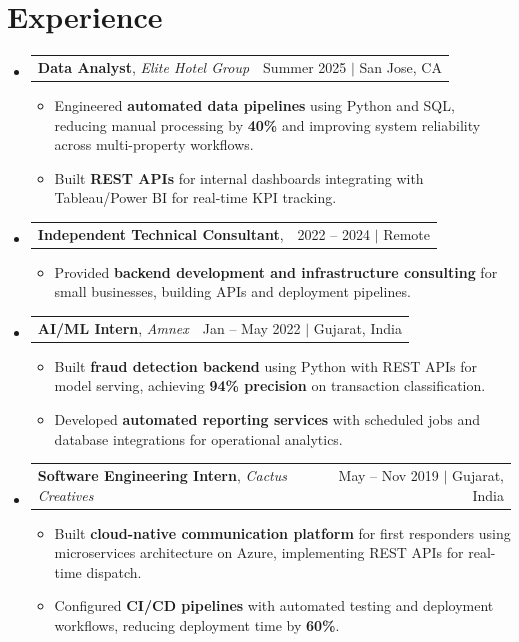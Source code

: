 \documentclass[letterpaper,10pt]{article}
\makeatletter
\newcommand{\resumeItem}[1]{\item\small{#1 \vspace{-3pt}}}
\newcommand{\resumeExpHeading}[4]{
  \vspace{-3pt}\item
    \begin{tabular*}{0.97\textwidth}[t]{l@{\extracolsep{\fill}}r}
      \textbf{#1}, \textit{#3} & #2 \\
    \end{tabular*}\vspace{-8pt}
}
\newcommand{\resumeSubHeadingListStart}{\begin{itemize}[leftmargin=0.12in, label={}]}
\newcommand{\resumeSubHeadingListEnd}{\end{itemize}}
\newcommand{\resumeItemListStart}{\begin{itemize}[leftmargin=0.15in]}
\newcommand{\resumeItemListEnd}{\end{itemize}\vspace{-6pt}}
\makeatother
\begin{document}
\section{Experience}
  \resumeSubHeadingListStart

    \resumeExpHeading
      {Data Analyst}{Summer 2025 $|$ San Jose, CA}
      {Elite Hotel Group}{}
      \resumeItemListStart
        \resumeItem{Engineered \textbf{automated data pipelines} using Python and SQL, reducing manual processing by \textbf{40\%} and improving system reliability across multi-property workflows.}
        \resumeItem{Built \textbf{REST APIs} for internal dashboards integrating with Tableau/Power BI for real-time KPI tracking.}
      \resumeItemListEnd

    \resumeExpHeading
      {Independent Technical Consultant}{2022 -- 2024 $|$ Remote}
      {}{}
      \resumeItemListStart
        \resumeItem{Provided \textbf{backend development and infrastructure consulting} for small businesses, building APIs and deployment pipelines.}
      \resumeItemListEnd

    \resumeExpHeading
      {AI/ML Intern}{Jan -- May 2022 $|$ Gujarat, India}
      {Amnex}{}
      \resumeItemListStart
        \resumeItem{Built \textbf{fraud detection backend} using Python with REST APIs for model serving, achieving \textbf{94\% precision} on transaction classification.}
        \resumeItem{Developed \textbf{automated reporting services} with scheduled jobs and database integrations for operational analytics.}
      \resumeItemListEnd

    \resumeExpHeading
      {Software Engineering Intern}{May -- Nov 2019 $|$ Gujarat, India}
      {Cactus Creatives}{}
      \resumeItemListStart
        \resumeItem{Built \textbf{cloud-native communication platform} for first responders using microservices architecture on Azure, implementing REST APIs for real-time dispatch.}
        \resumeItem{Configured \textbf{CI/CD pipelines} with automated testing and deployment workflows, reducing deployment time by \textbf{60\%}.}
      \resumeItemListEnd

  \resumeSubHeadingListEnd

\end{document}
